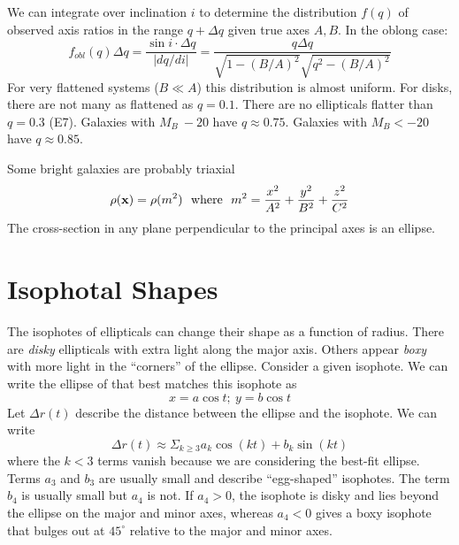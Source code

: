 \documentclass[]{article}
\begin{document}
We can integrate over inclination $i$ to determine the distribution $f(q)$ of observed axis
ratios in the range $q +\Delta q$ given true axes $A,B$.  In the oblong case:
\begin{equation}
f_{obl}(q) \Delta q = \frac{\sin i \cdot \Delta q}{|dq/di|} = \frac{q\Delta q}{\sqrt{1-(B/A)^2}\sqrt{q^2-(B/A)^2}}
\end{equation}
\noindent
For very flattened systems ($B\ll A$) this distribution is almost uniform.  
For disks, there are not many as flattened as $q=0.1$. There
are no ellipticals flatter than $q=0.3$ (E7).
Galaxies with $M_B~-20$ have $q\approx0.75$. Galaxies with $M_B<-20$ have $q\approx0.85$.

Some bright galaxies are probably triaxial
\begin{equation}
\rho(\mathbf{x}) = \rho(m^2)~~\mathrm{where}~~m^2 = \frac{x^2}{A^2} + \frac{y^2}{B^2} + \frac{z^2}{C^2}
\end{equation}
\noindent
The cross-section in any plane perpendicular to the principal axes is an ellipse.


\section{Isophotal Shapes}

The isophotes of ellipticals can change their shape as a function of
radius.  There are {\it disky} ellipticals with extra light along the major axis.
Others appear {\it boxy} with more light in the ``corners'' of the ellipse.
Consider a given isophote.  We can write the ellipse of that best matches this isophote as
\begin{equation}
x = a \cos t;~y=b\cos t
\end{equation}
\noindent
Let $\Delta r(t)$ describe the distance between the ellipse and the isophote.  We
can write
\begin{equation}
\Delta r(t) \approx \Sigma_{k\ge3} a_k \cos(k t) + b_k \sin(kt)
\end{equation}
\noindent
where the $k<3$ terms vanish because we are considering the best-fit ellipse.
Terms $a_3$ and $b_3$ are usually small and describe ``egg-shaped'' isophotes.
The term $b_4$ is usually small but $a_4$ is not.  If $a_4>0$, the
isophote is disky and lies beyond the ellipse on the major and minor axes, 
whereas $a_4<0$ gives a boxy isophote that bulges out at $45^{\circ}$ relative
to the major and minor axes.
\end{document}
